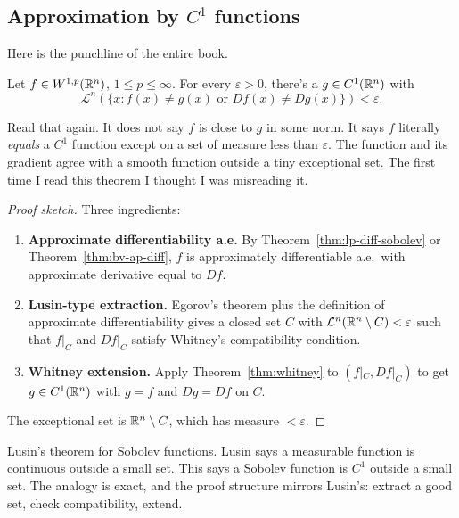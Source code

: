 \subsection{Approximation by $C^1$ functions}\label{subsec:c1-approx}

Here is the punchline of the entire book.

\begin{theorem}[$C^1$ approximation]\label{thm:c1-approx}
Let $f \in W^{1,p}(\mathbb{R}^n)$, $1 \le p \le \infty$. For every $\varepsilon > 0$, there's a $g \in C^1(\mathbb{R}^n)$ with
\[
    \mathcal{L}^n\!\left(\{x : f(x) \neq g(x) \text{ or } Df(x) \neq Dg(x)\}\right) < \varepsilon.
\]
\end{theorem}

Read that again. It does not say $f$ is close to $g$ in some norm. It says $f$ literally \emph{equals} a $C^1$ function except on a set of measure less than $\varepsilon$. The function and its gradient agree with a smooth function outside a tiny exceptional set. The first time I read this theorem I thought I was misreading it.

\begin{proof}[Proof sketch]
Three ingredients:
\begin{enumerate}
    \item \textbf{Approximate differentiability a.e.} By Theorem~\ref{thm:lp-diff-sobolev} or Theorem~\ref{thm:bv-ap-diff}, $f$ is approximately differentiable a.e.\ with approximate derivative equal to $Df$.

    \item \textbf{Lusin-type extraction.} Egorov's theorem plus the definition of approximate differentiability gives a closed set $C$ with $\mathcal{L}^n(\mathbb{R}^n \setminus C) < \varepsilon$ such that $f|_C$ and $Df|_C$ satisfy Whitney's compatibility condition.

    \item \textbf{Whitney extension.} Apply Theorem~\ref{thm:whitney} to $(f|_C, Df|_C)$ to get $g \in C^1(\mathbb{R}^n)$ with $g = f$ and $Dg = Df$ on $C$.
\end{enumerate}
The exceptional set is $\mathbb{R}^n \setminus C$, which has measure $< \varepsilon$.
\end{proof}

Lusin's theorem for Sobolev functions. Lusin says a measurable function is continuous outside a small set. This says a Sobolev function is $C^1$ outside a small set. The analogy is exact, and the proof structure mirrors Lusin's: extract a good set, check compatibility, extend.

